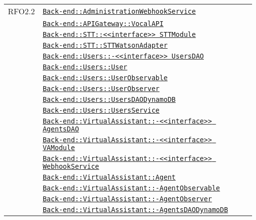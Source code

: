 \begin{longtable}{|>{\centering}m{3cm}|m{10cm}<{\centering}|}
RFO2.2 & \hyperref[Back-end::AdministrationWebhookService]{\texttt{Back-end::AdministrationWebhookService}}\\
& \hyperref[Back-end::APIGateway::VocalAPI]{\texttt{Back-end::APIGateway::VocalAPI}}\\
& \hyperref[Back-end::STT::<<interface>> STTModule]{\texttt{Back-end::STT::<<interface>> STTModule}}\\
& \hyperref[Back-end::STT::STTWatsonAdapter]{\texttt{Back-end::STT::STTWatsonAdapter}}\\
& \hyperref[Back-end::Users::<<interface>> UsersDAO]{\texttt{Back-end::Users::-\linebreak <<interface>> UsersDAO}}\\
& \hyperref[Back-end::Users::User]{\texttt{Back-end::Users::User}}\\
& \hyperref[Back-end::Users::UserObservable]{\texttt{Back-end::Users::UserObservable}}\\
& \hyperref[Back-end::Users::UserObserver]{\texttt{Back-end::Users::UserObserver}}\\
& \hyperref[Back-end::Users::UsersDAODynamoDB]{\texttt{Back-end::Users::UsersDAODynamoDB}}\\
& \hyperref[Back-end::Users::UsersService]{\texttt{Back-end::Users::UsersService}}\\
& \hyperref[Back-end::VirtualAssistant::<<interface>> AgentsDAO]{\texttt{Back-end::VirtualAssistant::-\linebreak <<interface>> AgentsDAO}}\\
& \hyperref[Back-end::VirtualAssistant::<<interface>> VAModule]{\texttt{Back-end::VirtualAssistant::-\linebreak <<interface>> VAModule}}\\
& \hyperref[Back-end::VirtualAssistant::<<interface>> WebhookService]{\texttt{Back-end::VirtualAssistant::-\linebreak <<interface>> WebhookService}}\\
& \hyperref[Back-end::VirtualAssistant::Agent]{\texttt{Back-end::VirtualAssistant::Agent}}\\
& \hyperref[Back-end::VirtualAssistant::AgentObservable]{\texttt{Back-end::VirtualAssistant::-\linebreak AgentObservable}}\\
& \hyperref[Back-end::VirtualAssistant::AgentObserver]{\texttt{Back-end::VirtualAssistant::-\linebreak AgentObserver}}\\
& \hyperref[Back-end::VirtualAssistant::AgentsDAODynamoDB]{\texttt{Back-end::VirtualAssistant::-\linebreak AgentsDAODynamoDB}}\\

\end{longtable}
